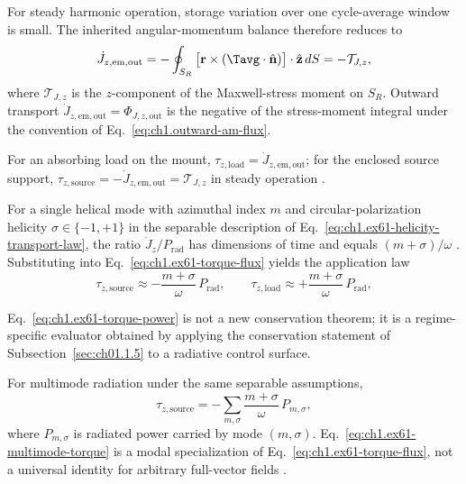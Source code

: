 For steady harmonic operation, storage variation over one cycle-average window is
small. The inherited angular-momentum balance therefore reduces to
\begin{equation}
\label{eq:ch1.ex61-torque-flux}
\dot J_{z,\mathrm{em,out}}
=
-\oint_{S_R}
\big[\mathbf{r}\times(\Tavg\cdot\hat{\mathbf{n}})\big]\cdot\hat{\mathbf{z}}\,dS
=-\mathcal{T}_{J,z},
\end{equation}
where \(\mathcal{T}_{J,z}\) is the $z$-component of the Maxwell-stress moment on \(S_R\). Outward transport \(\dot J_{z,\mathrm{em,out}}=\Phi_{J,z,\mathrm{out}}\) is the negative of the stress-moment integral under the convention of Eq.~\eqref{eq:ch1.outward-am-flux}.

For an absorbing load on the mount, \(\tau_{z,\mathrm{load}}=\dot J_{z,\mathrm{em,out}}\); for the enclosed source support, \(\tau_{z,\mathrm{source}}=-\dot J_{z,\mathrm{em,out}}=\mathcal{T}_{J,z}\) in steady operation \cite{beth1936}.

For a single helical mode with azimuthal index \(m\) and circular-polarization helicity \(\sigma\in\{-1,+1\}\) in the separable description of Eq.~\eqref{eq:ch1.ex61-helicity-transport-law}, the ratio \(\dot J_z/P_{\mathrm{rad}}\) has dimensions of time and equals \((m+\sigma)/\omega\) \cite{stratton1941}. Substituting into Eq.~\eqref{eq:ch1.ex61-torque-flux} yields the application law
\begin{equation}
\label{eq:ch1.worked-helical-torque}
\tau_{z,\mathrm{source}}
\approx
-\frac{m+\sigma}{\omega}\,P_{\mathrm{rad}},
\qquad
\tau_{z,\mathrm{load}}
\approx
+\frac{m+\sigma}{\omega}\,P_{\mathrm{rad}},
\end{equation}
\addtocounter{equation}{-1}\label{eq:ch1.ex61-torque-power}%
Eq.~\eqref{eq:ch1.ex61-torque-power} is not a new conservation theorem; it
is a regime-specific evaluator obtained by applying the conservation
statement of Subsection~\ref{sec:ch01.1.5} to a radiative control surface.

For multimode radiation under the same separable assumptions,
\begin{equation}
\label{eq:ch1.ex61-multimode-torque}
\tau_{z,\mathrm{source}}
=
-\sum_{m,\sigma}\frac{m+\sigma}{\omega}\,P_{m,\sigma},
\end{equation}
where \(P_{m,\sigma}\) is radiated power carried by mode \((m,\sigma)\). Eq.~\eqref{eq:ch1.ex61-multimode-torque} is a modal specialization of Eq.~\eqref{eq:ch1.ex61-torque-flux}, not a universal identity for arbitrary full-vector fields \cite{stratton1941}.

